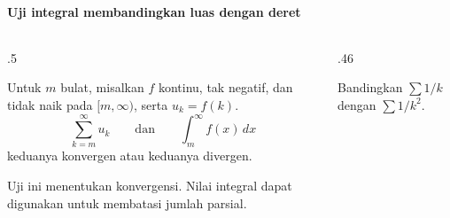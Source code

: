 \documentclass{../../kalkulus-ppt}
\begin{document}
\begin{frame}{\insertsection}
    \framesubtitle{Uji integral membandingkan luas dengan deret}
    \begin{columns}[c,onlytextwidth]
        \begin{column}{.5\textwidth}
            \begin{teorema}
                Untuk $m$ bulat, misalkan $f$ kontinu, tak negatif,
                dan tidak naik pada $[m,\infty)$, serta $u_k=f(k)$.
                \[
                    \sum_{k=m}^{\infty}u_k
                    \qquad\text{dan}\qquad
                    \int_m^\infty f(x)\,dx
                \]
                keduanya konvergen atau keduanya divergen.
            \end{teorema}
            Uji ini menentukan konvergensi. Nilai integral
            dapat digunakan untuk membatasi jumlah parsial.
        \end{column}
        \begin{column}{.46\textwidth}
            \begin{contoh}
                Bandingkan $\sum 1/k$ dengan $\sum 1/k^2$.
            \end{contoh}
        \end{column}
    \end{columns}
\end{frame}
\end{document}
